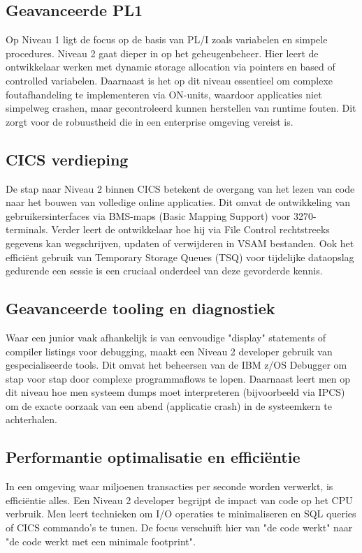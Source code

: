 \subsection{Geavanceerde PL1}
\label{sec:geavanceerde-pli}
Op Niveau 1 ligt de focus op de basis van PL/I zoals variabelen en simpele procedures.
Niveau 2 gaat dieper in op het geheugenbeheer.
Hier leert de ontwikkelaar werken met dynamic storage allocation via pointers en based of controlled variabelen. 
Daarnaast is het op dit niveau essentieel om complexe foutafhandeling te implementeren via ON-units, waardoor applicaties niet simpelweg crashen, maar gecontroleerd kunnen herstellen van runtime fouten.
Dit zorgt voor de robuustheid die in een enterprise omgeving vereist is.

\subsection{CICS verdieping}
\label{sec:cics-verdieping}
De stap naar Niveau 2 binnen CICS betekent de overgang van het lezen van code naar het bouwen van volledige online applicaties.
Dit omvat de ontwikkeling van gebruikersinterfaces via BMS-maps (Basic Mapping Support) voor 3270-terminals. 
Verder leert de ontwikkelaar hoe hij via File Control rechtstreeks gegevens kan wegschrijven, updaten of verwijderen in VSAM bestanden.
Ook het efficiënt gebruik van Temporary Storage Queues (TSQ) voor tijdelijke dataopslag gedurende een sessie is een cruciaal onderdeel van deze gevorderde kennis.

\subsection{Geavanceerde tooling en diagnostiek}
\label{sec:geavanceerde-tooling}
Waar een junior vaak afhankelijk is van eenvoudige "display" statements of compiler listings voor debugging, maakt een Niveau 2 developer gebruik van gespecialiseerde tools.
Dit omvat het beheersen van de IBM z/OS Debugger om stap voor stap door complexe programmaflows te lopen. 
Daarnaast leert men op dit niveau hoe men systeem dumps moet interpreteren (bijvoorbeeld via IPCS) om de exacte oorzaak van een abend (applicatie crash) in de systeemkern te achterhalen.

\subsection{Performantie optimalisatie en efficiëntie}
\label{sec:performantie-optimalisatie}
In een omgeving waar miljoenen transacties per seconde worden verwerkt, is efficiëntie alles.
Een Niveau 2 developer begrijpt de impact van code op het CPU verbruik. 
Men leert technieken om I/O operaties te minimaliseren en SQL queries of CICS commando's te tunen. 
De focus verschuift hier van "de code werkt" naar "de code werkt met een minimale footprint".

